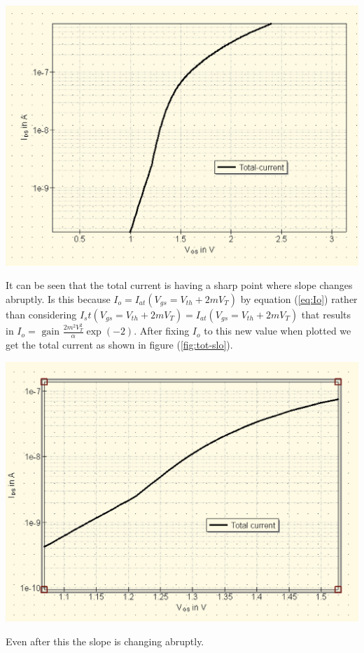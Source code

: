 \documentclass{article}
\begin{document}
\begin{center}
    \label{fig:total-current}
    \includegraphics[scale = 0.6]{../Images/03082024/slope-tot.png}
\end{center}
It can be seen that the total current is having a sharp point where slope changes abruptly. 
Is this because $I_o = I_{at}(V_{gs}=V_{th}+ 2 m V_T) $ by equation (\ref{eq:Io})  rather than considering $I_st (V_{gs}=V_{th}+ 2 m V_T) = I_{at}(V_{gs}=V_{th}+ 2 m V_T) $ that results in $I_o =  \text{ gain } \frac{2 m^2 V_T ^ 2 }{\alpha}  \exp(-2)$. After fixing $I_o$ to this new value when plotted we get the total current as shown in figure (\ref{fig:tot-slo}).  
\begin{center}
    \label{fig:tot-slo}
    \includegraphics[scale=0.6]{../Images/03082024/Ioexp2.png}
\end{center}
Even after this the slope is changing abruptly.
\end{document}
